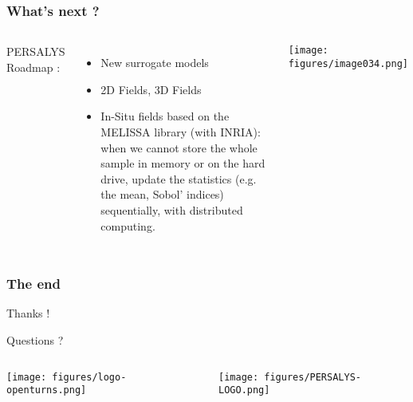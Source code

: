 \documentclass{beamer}
\begin{document}
\begin{frame}
\frametitle{What's next ?}
  \begin{columns}

PERSALYS Roadmap : 
\begin{itemize}
\item New surrogate models
\item 2D Fields, 3D Fields
\item In-Situ fields based on the MELISSA library (with INRIA): 
when we cannot store the whole sample in memory or on the hard drive, 
update the statistics (e.g. the mean, Sobol' indices) sequentially, 
with distributed computing. 
\end{itemize}


\begin{center}
\texttt{[image: figures/image034.png]}
\end{center}

	\end{columns}

\end{frame}



\begin{frame}
\frametitle{The end}

\begin{center}
Thanks !
\end{center}

\begin{center}
Questions ?
\end{center}

\begin{columns}
\centering
\texttt{[image: figures/logo-openturns.png]}

\texttt{[image: figures/PERSALYS-LOGO.png]}

\end{columns}

\end{frame}
  
\end{document}
